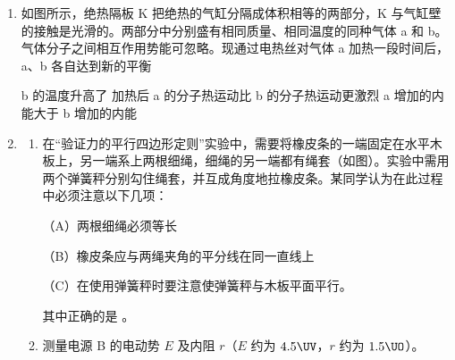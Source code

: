 \documentclass[\gkver]{gaokaozhenti}
\begin{document}
\begin{enumerate}
\item
如图所示，绝热隔板 K 把绝热的气缸分隔成体积相等的两部分，K 与气缸壁的接触是光滑的。两部分中分别盛有相同质量、相同温度的同种气体 a 和 b。气体分子之间相互作用势能可忽略。现通过电热丝对气体 a 加热一段时间后，a、b 各自达到新的平衡


{b 的温度升高了}
{加热后 a 的分子热运动比 b 的分子热运动更激烈}
{a 增加的内能大于 b 增加的内能}


\item
\begin{enumerate}
	\item
	在“验证力的平行四边形定则”实验中，需要将橡皮条的一端固定在水平木板上，另一端系上两根细绳，细绳的另一端都有绳套（如图）。实验中需用两个弹簧秤分别勾住绳套，并互成角度地拉橡皮条。某同学认为在此过程中必须注意以下几项：

	（A）两根细绳必须等长

	（B）橡皮条应与两绳夹角的平分线在同一直线上

	（C）在使用弹簧秤时要注意使弹簧秤与木板平面平行。

	其中正确的是 。


	\item
	测量电源 B 的电动势 $E$ 及内阻 $r$（$E$ 约为 $4.5\UV$，$r$ 约为 $1.5\UO$）。


\end{enumerate}
\end{enumerate}
\end{document}
